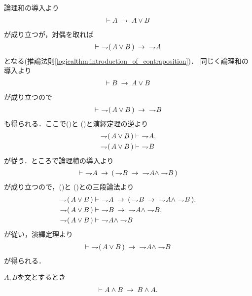 	\begin{prf}
		論理和の導入より
		\begin{align}
			\vdash A \hspace{0.25em}\rightarrow\hspace{0.25em} A \vee B
		\end{align}
		が成り立つが，対偶を取れば
		\begin{align}
			\vdash\ \rightharpoondown\hspace{-0.25em} (\, A \vee B\, ) \hspace{0.25em}\rightarrow\hspace{0.25em}\ \rightharpoondown\hspace{-0.25em} A
			\label{fom:weak_De_Morgan_law_2_1}
		\end{align}
		となる(推論法則\ref{logicalthm:introduction_of_contraposition})．
		同じく論理和の導入より
		\begin{align}
			\vdash B \hspace{0.25em}\rightarrow\hspace{0.25em} A \vee B
		\end{align}
		が成り立つので
		\begin{align}
			\vdash\ \rightharpoondown\hspace{-0.25em} (\, A \vee B\, ) \hspace{0.25em}\rightarrow\hspace{0.25em}\ \rightharpoondown\hspace{-0.25em} B
			\label{fom:weak_De_Morgan_law_2_2}
		\end{align}
		も得られる．ここで()と
		()と演繹定理の逆より
		\begin{align}
			\rightharpoondown\hspace{-0.25em} (\, A \vee B\, ) &\vdash\ \rightharpoondown\hspace{-0.25em} A, 
			\label{fom:weak_De_Morgan_law_2_3} \\
			\rightharpoondown\hspace{-0.25em} (\, A \vee B\, ) &\vdash\ \rightharpoondown\hspace{-0.25em} B
			\label{fom:weak_De_Morgan_law_2_4}
		\end{align}
		が従う．ところで論理積の導入より
		\begin{align}
			\vdash\ \rightharpoondown\hspace{-0.25em} A \hspace{0.25em}\rightarrow\hspace{0.25em} (\, \rightharpoondown\hspace{-0.25em} B \hspace{0.25em}\rightarrow\hspace{0.25em}\
			\rightharpoondown\hspace{-0.25em} A \wedge \rightharpoondown\hspace{-0.25em} B\, )
		\end{align}
		が成り立つので，()と
		()との三段論法より
		\begin{align}
			\negation (\, A \vee B\, ) &\vdash\ \negation A \rarrow 
				(\, \negation B \rarrow\ \negation A \wedge \negation B\, ), \\
			\negation (\, A \vee B\, ) &\vdash\ 
				\negation B \rarrow\ \negation A \wedge \negation B, \\
			\negation (\, A \vee B\, ) &\vdash\ \negation A \wedge \negation B
		\end{align}
		が従い，演繹定理より
		\begin{align}
			\vdash\ \rightharpoondown\hspace{-0.25em} (\, A \vee B\, ) 
			\hspace{0.25em}\rightarrow\hspace{0.25em}\ \rightharpoondown\hspace{-0.25em} A \wedge \rightharpoondown\hspace{-0.25em} B
		\end{align}
		が得られる．
		\QED
	\end{prf}
	
	\begin{screen}
		\begin{logicalthm}[論理積の可換律]
		\label{logicalthm:commutative_law_of_conjunction}
			$A,B$を文とするとき
			\begin{align}
				\vdash A \wedge B \hspace{0.25em}\rightarrow\hspace{0.25em} B \wedge A.
			\end{align}
		\end{logicalthm}
	\end{screen}
	
